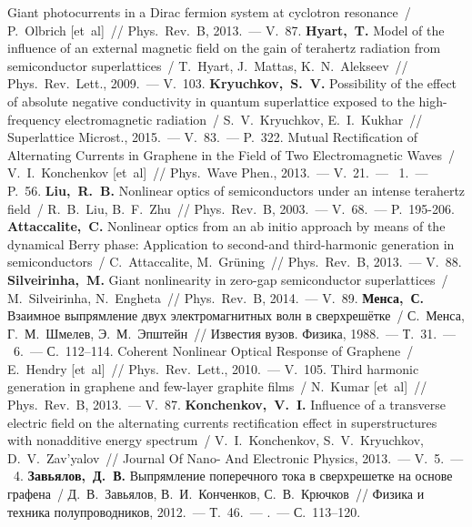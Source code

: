 \begin{thebibliography}{99}
       Giant photocurrents in a Dirac fermion system at cyclotron resonance~/ P.~Olbrich [et~al]~// Phys.~Rev.~B, 2013.~--- V.~87.
     \textbf{Hyart,~T.} Model of the influence of an external magnetic field on the gain of terahertz radiation from semiconductor superlattices~/ T.~Hyart, J.~Mattas, K. N. Alekseev~// Phys.~Rev.~Lett., 2009.~--- V.~103.
     \textbf{Kryuchkov,~S.~V.} Possibility of the effect of absolute negative conductivity in quantum superlattice exposed to the high-frequency electromagnetic radiation~/ S.~V.~Kryuchkov, E.~I.~Kukhar~// Superlattice Microst., 2015.~--- V.~83.~--- P.~322.
     Mutual Rectification of Alternating Currents in Graphene in the Field of Two Electromagnetic Waves~/ V.~I.~Konchenkov [et~al]~// Phys.~Wave Phen., 2013.~--- V.~21.~--- \No~1.~--- P. 56.
     \textbf{Liu,~R.~B.} Nonlinear optics of semiconductors under an intense terahertz field~/ R.~B.~Liu, B.~F.~Zhu~// Phys.~Rev.~B, 2003.~--- V.~68.~--- P.~195-206.
     \textbf{Attaccalite,~C.} Nonlinear optics from an ab initio approach by means of the dynamical Berry phase: Application to second-and third-harmonic generation in semiconductors~/ C.~Attaccalite, M.~Grüning~// Phys.~Rev.~B, 2013.~--- V.~88.
     \textbf{Silveirinha,~M.} Giant nonlinearity in zero-gap semiconductor superlattices~/ M. Silveirinha, N.~Engheta~// Phys.~Rev.~B, 2014.~--- V.~89.
       \textbf{Менса,~С.} Взаимное выпрямление двух электромагнитных волн в сверхрешётке~/ С.~Менса, Г.~М.~Шмелев, Э.~М.~Эпштейн~// Известия вузов. Физика, 1988.~--- Т.~31.~--- \No~6.~--- С.~112--114.
     Coherent Nonlinear Optical Response of Graphene~/ E.~Hendry [et~al]~// Phys.~Rev.~Lett., 2010.~--- V.~105.
     Third harmonic generation in graphene and few-layer graphite films~/ N.~Kumar [et~al]~// Phys.~Rev.~B, 2013.~--- V.~87.
     \textbf{Konchenkov,~V.~I.} Influence of a transverse electric field on the alternating currents rectification effect in superstructures with nonadditive energy spectrum~/ V.~I.~Konchenkov, S.~V.~Kryuchkov, D.~V.~Zav’yalov~// Journal Of Nano- And Electronic Physics, 2013.~--- V.~5.~--- \No~4.
     \textbf{Завьялов,~Д.~В.} Выпрямление поперечного тока в сверхрешетке на основе графена~/ Д.~В.~Завьялов, В.~И.~Конченков, С.~В.~Крючков~// Физика и техника полупроводников, 2012.~--- Т.~46.~--- .~--- С.~113--120.

\end{thebibliography}
